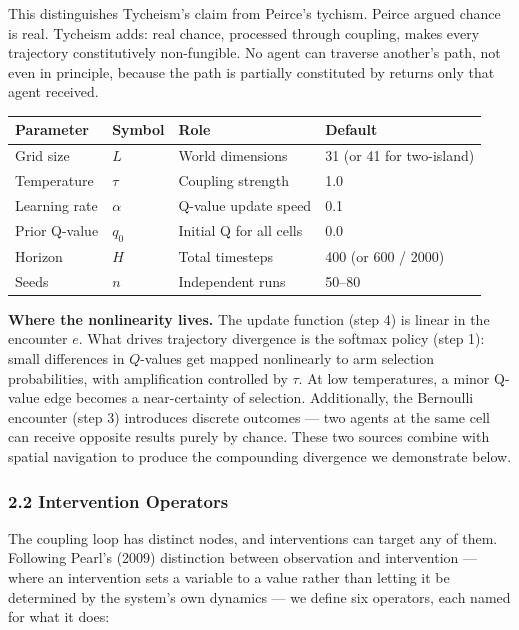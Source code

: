 \documentclass[
]{article}
\newcounter{none} %
\begin{document}
This distinguishes Tycheism's claim from Peirce's tychism. Peirce argued
chance is real. Tycheism adds: real chance, processed through coupling,
makes every trajectory constitutively non-fungible. No agent can
traverse another's path, not even in principle, because the path is
partially constituted by returns only that agent received.

{\def\LTcaptype{none} %
\begin{longtable}[]{@{}llll@{}}
\toprule\noalign{}
Parameter & Symbol & Role & Default \\
\midrule\noalign{}
\endhead
\bottomrule\noalign{}
\endlastfoot
Grid size & \(L\) & World dimensions & 31 (or 41 for two-island) \\
Temperature & \(\tau\) & Coupling strength & 1.0 \\
Learning rate & \(\alpha\) & Q-value update speed & 0.1 \\
Prior Q-value & \(q_0\) & Initial Q for all cells & 0.0 \\
Horizon & \(H\) & Total timesteps & 400 (or 600 / 2000) \\
Seeds & \(n\) & Independent runs & 50--80 \\
\end{longtable}
}

\textbf{Where the nonlinearity lives.} The update function (step 4) is
linear in the encounter \(e\). What drives trajectory divergence is the
softmax policy (step 1): small differences in \(Q\)-values get mapped
nonlinearly to arm selection probabilities, with amplification
controlled by \(\tau\). At low temperatures, a minor Q-value edge
becomes a near-certainty of selection. Additionally, the Bernoulli
encounter (step 3) introduces discrete outcomes --- two agents at the
same cell can receive opposite results purely by chance. These two
sources combine with spatial navigation to produce the compounding
divergence we demonstrate below.

\subsubsection{2.2 Intervention Operators}\label{intervention-operators}

The coupling loop has distinct nodes, and interventions can target any
of them. Following Pearl's (2009) distinction between observation and
intervention --- where an intervention sets a variable to a value rather
than letting it be determined by the system's own dynamics --- we define
six operators, each named for what it does:
\end{document}
